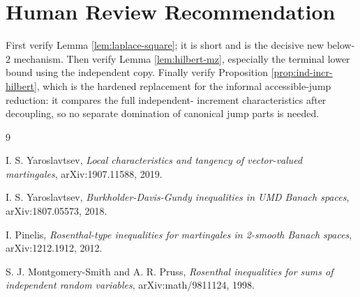 \documentclass[11pt]{article}
\begin{document}
\section*{Human Review Recommendation}

First verify Lemma \ref{lem:laplace-square}; it is short and is the decisive
new below-\(2\) mechanism.  Then verify Lemma \ref{lem:hilbert-mz}, especially
the terminal lower bound using the independent copy.  Finally verify
Proposition \ref{prop:ind-incr-hilbert}, which is the hardened replacement for
the informal accessible-jump reduction: it compares the full independent-
increment characteristics after decoupling, so no separate domination of
canonical jump parts is needed.

\begin{thebibliography}{9}

I. S. Yaroslavtsev,
\emph{Local characteristics and tangency of vector-valued martingales},
arXiv:1907.11588, 2019.

I. S. Yaroslavtsev,
\emph{Burkholder-Davis-Gundy inequalities in UMD Banach spaces},
arXiv:1807.05573, 2018.

I. Pinelis,
\emph{Rosenthal-type inequalities for martingales in 2-smooth Banach spaces},
arXiv:1212.1912, 2012.

S. J. Montgomery-Smith and A. R. Pruss,
\emph{Rosenthal inequalities for sums of independent random variables},
arXiv:math/9811124, 1998.

\end{thebibliography}
\end{document}
